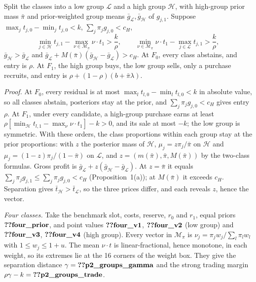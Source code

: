 \begin{resultbox}
Split the classes into a low group \(\mathcal L\) and a high group \(\mathcal H\), with high-group prior mass \(\bar\pi\)
and prior-weighted group means \(\bar g_{\mathcal L},\bar g_{\mathcal H}\) of \(g_{j,1}\). Suppose
\(\max_jt_{j,0}-\min_jt_{j,0}<k\), \(\sum_j\pi_jg_{j,0}<c_H\),
\[
\min_{j\in\mathcal H}t_{j,1}-\max_{\nu\in\mathcal M_\pi}\nu\cdot t_1>\frac k\rho,\qquad
\min_{\nu\in\mathcal M_\pi}\nu\cdot t_1-\max_{j\in\mathcal L}t_{j,1}>\frac k\rho,
\]
\(\bar g_{\mathcal H}>\bar g_{\mathcal L}\) and \(\bar g_{\mathcal L}+M(\bar\pi)(\bar g_{\mathcal H}-\bar g_{\mathcal L})>c_H\).
At \(F_0\), every class abstains, and entry is \(\rho\). At \(F_1\), the high group buys, the low group sells, only a
purchase recruits, and entry is \(\rho+(1-\rho)(b+\bar\pi\lambda)\).
\end{resultbox}

\emph{Proof.} At \(F_0\), every residual is at most \(\max_lt_{l,0}-\min_lt_{l,0}<k\) in absolute value, so all classes
abstain, posteriors stay at the prior, and \(\sum_j\pi_jg_{j,0}<c_H\) gives entry \(\rho\). At \(F_1\), under every
candidate, a high-group purchase earns at least \(\rho[\min_{\mathcal H}t_{l,1}-\max_\nu\nu\cdot t_1]-k>0\), and its
sale at most \(-k\); the low group is symmetric. With these orders, the class proportions within each group stay at
the prior proportions: with \(z\) the posterior mass of \(\mathcal H\), \(\mu_j=z\pi_j/\bar\pi\) on \(\mathcal H\) and
\(\mu_j=(1-z)\pi_j/(1-\bar\pi)\) on \(\mathcal L\), and \(z=(m(\bar\pi),\bar\pi,M(\bar\pi))\) by the two-class formulas.
Gross profit is \(\bar g_{\mathcal L}+z(\bar g_{\mathcal H}-\bar g_{\mathcal L})\). At \(z=\bar\pi\) it equals
\(\sum_j\pi_jg_{j,1}\le\sum_j\pi_jg_{j,0}<c_H\) (Proposition~1(a)); at \(M(\bar\pi)\) it exceeds \(c_H\). Separation
gives \(\bar t_{\mathcal H}>\bar t_{\mathcal L}\), so the three prices differ, and each reveals \(z\), hence the vector.

\emph{Four classes.} Take the benchmark slot, costs, reserve, \(r_0\) and \(r_1\), equal priors \(\reg{four_prior}\),
and point values \(\reg{four_v1}\), \(\reg{four_v2}\) (low group) and \(\reg{four_v3}\), \(\reg{four_v4}\) (high group).
Every vector in \(\mathcal M_\pi\) is \(\nu_j=\pi_jw_j/\sum_l\pi_lw_l\) with \(1\le w_j\le1+u\). The mean \(\nu\cdot t\)
is linear-fractional, hence monotone, in each weight, so its extremes lie at the 16 corners of the weight box. They
give the separation distance \(\gamma=\reg{p2_groups_gamma}\) and the strong trading margin
\(\rho\gamma-k=\reg{p2_groups_trade}\).

